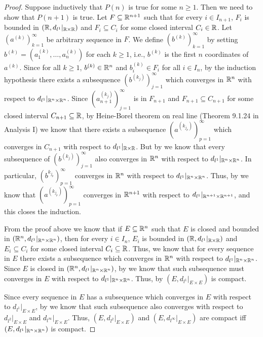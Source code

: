\begin{proof}
  Suppose inductively that \(P(n)\) is true for some \(n \geq 1\).
  Then we need to show that \(P(n + 1)\) is true.
  Let \(F \subseteq \mathbb{R}^{n + 1}\) such that for every \(i \in I_{n + 1}\), \(F_i\) is bounded in \((\mathbb{R}, d_{l^1}|_{\mathbb{R} \times \mathbb{R}})\) and \(F_i \subseteq C_i\) for some closed interval \(C_i \in \mathbb{R}\).
  Let \((a^{(k)})_{k = 1}^\infty\) be arbitrary sequence in \(F\).
  We define \((b^{(k)})_{k = 1}^\infty\) by setting \(b^{(k)} = (a_1^{(k)}, \dots, a_n^{(k)})\) for each \(k \geq 1\), i.e., \(b^{(k)}\) is the first \(n\) coordinates of \(a^{(k)}\).
  Since for all \(k \geq 1\), \(b^{(k)} \in \mathbb{R}^n\) and \(b_i^{(k)} \in F_i\) for all \(i \in I_n\), by the induction hypothesis there exists a subsequence \((b^{(k_j)})_{j = 1}^\infty\) which converges in \(\mathbb{R}^n\) with respect to \(d_{l^1}|_{\mathbb{R}^n \times \mathbb{R}^n}\).
  Since \((a_{n + 1}^{(k_j)})_{j = 1}^\infty\) is in \(F_{n + 1}\) and \(F_{n + 1} \subseteq C_{n + 1}\) for some closed interval \(C_{n + 1} \subseteq \mathbb{R}\), by Heine-Borel theorem on real line (Theorem 9.1.24 in Analysis I) we know that there exists a subsequence \((a^{(k_{j_p})})_{p = 1}^\infty\) which converges in \(C_{n + 1}\) with respect to \(d_{l^1}|_{\mathbb{R} \times \mathbb{R}}\).
  But by  we know that every subsequence of \((b^{(k_j)})_{j = 1}^\infty\) also converges in \(\mathbb{R}^n\) with respect to \(d_{l^1}|_{\mathbb{R}^n \times \mathbb{R}^n}\).
  In particular, \((b^{k_{j_p}})_{p = 1}^\infty\) converges in \(\mathbb{R}^n\) with respect to \(d_{l^1}|_{\mathbb{R}^n \times \mathbb{R}^n}\).
  Thus, by  we know that \((a^{(k_{j_p})})_{p = 1}^\infty\) converges in \(\mathbb{R}^{n + 1}\) with respect to \(d_{l^1}|_{\mathbb{R}^{n + 1} \times \mathbb{R}^{n + 1}}\), and this closes the induction.

  From the proof above we know that if \(E \subseteq \mathbb{R}^n\) such that \(E\) is closed and bounded in \((\mathbb{R}^n, d_{l^1}|_{\mathbb{R}^n \times \mathbb{R}^n})\), then for every \(i \in I_n\), \(E_i\) is bounded in \((\mathbb{R}, d_{l^1}|_{\mathbb{R} \times \mathbb{R}})\) and \(E_i \subseteq C_i\) for some closed interval \(C_i \subseteq \mathbb{R}\).
  Thus, we know that for every sequence in \(E\) there exists a subsequence which converges in \(\mathbb{R}^n\) with respect to \(d_{l^1}|_{\mathbb{R}^n \times \mathbb{R}^n}\).
  Since \(E\) is closed in \((\mathbb{R}^n, d_{l^1}|_{\mathbb{R}^n \times \mathbb{R}^n})\), by  we know that such subsequence must converges in \(E\) with respect to \(d_{l^1}|_{\mathbb{R}^n \times \mathbb{R}^n}\).
  Thus, by  \((E, d_{l^1}|_{E \times E})\) is compact.

  Since every sequence in \(E\) has a subsequence which converges in \(E\) with respect to \(d_{l^1}|_{E \times E}\), by  we know that such subsequence also converges with respect to \(d_{l^2}|_{E \times E}\) and \(d_{l^\infty}|_{E \times E}\).
  Thus, \((E, d_{l^2}|_{E \times E})\) and \((E, d_{l^\infty}|_{E \times E})\) are compact iff \((E, d_{l^1}|_{\mathbb{R}^n \times \mathbb{R}^n})\) is compact.
\end{proof}

